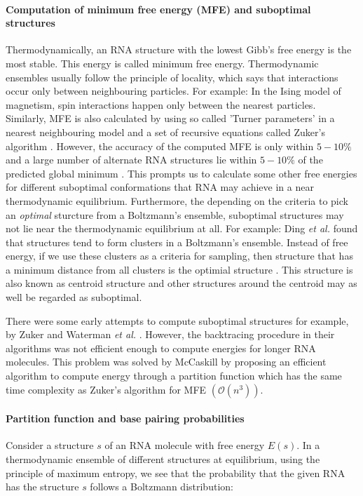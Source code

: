 \paragraph{Computation of minimum free energy (MFE) and suboptimal structures}
Thermodynamically, an RNA structure with the lowest Gibb's free energy is the most stable. This energy is called minimum free energy. Thermodynamic ensembles usually follow the principle of locality, which says that interactions occur only between neighbouring particles. For example: In the Ising model of magnetism, spin interactions happen only between the nearest particles. Similarly, MFE is also calculated by using so called 'Turner parameters' \cite{turner2009nndb} in a nearest neighbouring model and a set of recursive equations called Zuker's algorithm \cite{zuker1981optimal}. However, the accuracy of the computed MFE is only within $5-10\%$ and a large number of alternate RNA structures lie within $5-10\%$ of the predicted global minimum \cite{eddy2004rna}. This prompts us to calculate some other free energies for different suboptimal conformations that RNA may achieve in a near thermodynamic equilibrium. Furthermore, the depending on the criteria to pick an \textit{optimal} sturcture from a Boltzmann's ensemble, suboptimal structures may not lie near the thermodynamic equilibrium at all. For example: Ding \textit{et al.} \cite{ding2005rna}  found that structures tend to form clusters in a Boltzmann's ensemble. Instead of free energy, if we use these clusters as a criteria for sampling, then structure that has a minimum distance from all clusters is the optimial structure \cite{lorenz2016predicting}. This structure is also known as centroid structure and other structures around the centroid may as well be regarded as suboptimal.



There were some early attempts to compute suboptimal structures for example, by Zuker \cite{zuker1989finding} and Waterman \textit{et al.} \cite{waterman1985dynamic}. However, the backtracing procedure in their algorithms was not efficient enough to compute energies for longer RNA molecules. This problem was solved by McCaskill \cite{mccaskill1990equilibrium} by proposing an efficient algorithm to compute energy through a partition function which has the same time complexity as Zuker's algorithm for MFE $(\mathcal{O}(n^{3}))$.

\paragraph{Partition function and base pairing probabilities}
Consider a structure $s$ of an RNA molecule with free energy $E(s)$. In a thermodynamic ensemble of different structures at equilibrium, using the principle of maximum entropy, we see that the probability that the given RNA has the structure $s$ follows a Boltzmann distribution:

